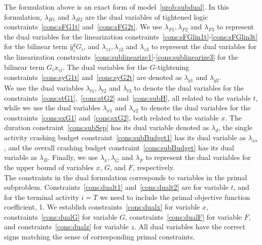 \documentclass[11pt]{article}
\newcommand{\noi}{\noindent}
\begin{document}
	\noi The formulation above is an exact form of model~\eqref{prob:subdual}. In this formulation, \(\lambda_{H1}\) and \(\lambda_{H2}\) are the dual variables of tightened logic constraints~\eqref{cons:sFG1t} and~\eqref{cons:sFG2t}. We use \(\lambda_{F1}, \lambda_{F2}\) and \(\lambda_{F3}\) to represent the dual variables for the linearization constraints~\eqref{cons:sFGlin1t}-\eqref{cons:sFGlin3t} for the bilinear term \(\hat{y}_i^q G_i\), and \(\lambda_{z1}, \lambda_{z2}\) and \(\lambda_{z3}\) to represent the dual variables for the linearization constraints~\eqref{cons:sublinearize1}-\eqref{cons:sublinearize3} for the bilinear term \(G_{i} x_{ij}\). The dual variables for the \(G\)-tightening constraints~\eqref{cons:syG1t} and~\eqref{cons:syG2t} are denoted as \(\lambda_{y1}\) and \(\lambda_{y2}\). \\
	\newline
	We use the dual variables \(\lambda_{t1}, \lambda_{t2}\) and \(\lambda_{t3}\) to denote the dual variables for the constraints~\eqref{cons:stG1},~\eqref{cons:stG2} and~\eqref{cons:subH}, all related to the variable \(t\), while we use the dual variables \(\lambda_{x1}\) and \(\lambda_{x2}\) to denote the dual variables for the constraints~\eqref{cons:sxG1} and~\eqref{cons:sxG2}, both related to the variable \(x\). The duration constraint~\eqref{cons:subSep} has its dual variable denoted as \(\lambda_{d}\), the single activity crashing budget constraint~\eqref{cons:subBudget1} has its dual variable as \(\lambda_{xs}\), and the overall crashing budget constraint~\eqref{cons:subBudget} has its dual variable as \(\lambda_B\). Finally, we use \(\lambda_{\bar{x}}, \lambda_{\bar{G}}\) and \(\lambda_{\bar{F}}\) to represent the dual variables for the upper bound of variables \(x\), \(G\), and \(F\), respectively.\\
	\newline
	The constraints in the dual formulation corresponds to variables in the primal subproblem. Constraints~\eqref{cons:dualt1} and~\eqref{cons:dualt2} are for variable \(t\), and for the terminal activity \(i = T\) we need to include the primal objective function coefficient, 1. We establish constraints~\eqref{cons:dualx} for variable \(x\), constraints~\eqref{cons:dualG} for variable \(G\), constraints~\eqref{cons:dualF} for variable \(F\), and constraints~\eqref{cons:dualz} for variable \(z\). All dual variables have the correct signs matching the sense of corresponding primal constraints.
	
\end{document}

